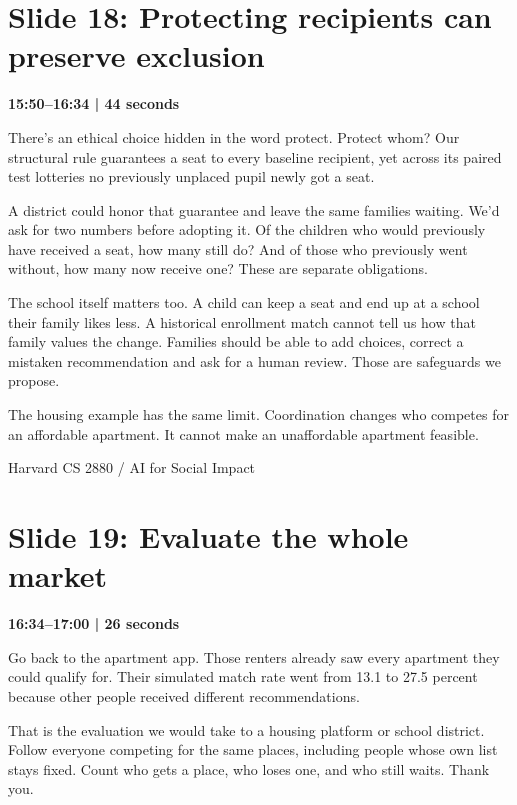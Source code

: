 \documentclass[11pt]{article}
\begin{document}
\section*{Slide 18: Protecting recipients can preserve exclusion}
{\color{navy}\textbf{15:50--16:34 | 44 seconds}}\par\medskip
There's an ethical choice hidden in the word protect. Protect whom? Our structural rule guarantees a seat to every baseline recipient, yet across its paired test lotteries no previously unplaced pupil newly got a seat.
\par
A district could honor that guarantee and leave the same families waiting. We'd ask for two numbers before adopting it. Of the children who would previously have received a seat, how many still do? And of those who previously went without, how many now receive one? These are separate obligations.
\par
The school itself matters too. A child can keep a seat and end up at a school their family likes less. A historical enrollment match cannot tell us how that family values the change. Families should be able to add choices, correct a mistaken recommendation and ask for a human review. Those are safeguards we propose.
\par
The housing example has the same limit. Coordination changes who competes for an affordable apartment. It cannot make an unaffordable apartment feasible.
\par
\newpage
{\small Harvard CS 2880 / AI for Social Impact}\par
\section*{Slide 19: Evaluate the whole market}
{\color{navy}\textbf{16:34--17:00 | 26 seconds}}\par\medskip
Go back to the apartment app. Those renters already saw every apartment they could qualify for. Their simulated match rate went from 13.1 to 27.5 percent because other people received different recommendations.
\par
That is the evaluation we would take to a housing platform or school district. Follow everyone competing for the same places, including people whose own list stays fixed. Count who gets a place, who loses one, and who still waits. Thank you.
\par
\end{document}
